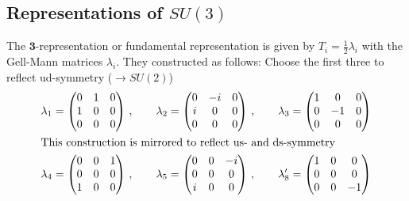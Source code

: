 \subsection{Representations of $SU(3)$}

The $\mathbf{3}$-representation or fundamental representation is given by $T_i=\frac{1}{2}\lambda_i$ with the Gell-Mann matrices $\lambda_i$. They constructed as follows: Choose the first three to reflect ud-symmetry ($\to SU(2)$)
\begin{subequations}
    \begin{align}
        \lambda_1=\begin{pmatrix}
            0 & 1 & 0 \\
            1 & 0 & 0 \\
            0 & 0 & 0
        \end{pmatrix}\,,\qquad
        \lambda_2=\begin{pmatrix}
            0      & -\imagu & 0 \\
            \imagu & 0       & 0 \\
            0      & 0       & 0
        \end{pmatrix}\,,\qquad
        \lambda_3=\begin{pmatrix}
            1 & 0  & 0 \\
            0 & -1 & 0 \\
            0 & 0  & 0
        \end{pmatrix}        \\
        \intertext{This construction is mirrored to reflect us- and ds-symmetry}
        \lambda_4=\begin{pmatrix}
            0 & 0 & 1 \\
            0 & 0 & 0 \\
            1 & 0 & 0
        \end{pmatrix}\,,\qquad
        \lambda_5=\begin{pmatrix}
            0      & 0 & -\imagu \\
            0      & 0 & 0       \\
            \imagu & 0 & 0       \\
        \end{pmatrix}\,,\qquad
        \lambda_8^\prime=\begin{pmatrix}
            1 & 0 & 0  \\
            0 & 0 & 0  \\
            0 & 0 & -1
        \end{pmatrix} \\

\end{align}
\end{subequations}
